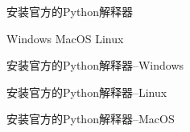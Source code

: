 \begin{frame}[standout]{安装官方的Python解释器}
    \begin{myoutline}
        \1 Windows
        \1 MacOS
        \1 Linux
    \end{myoutline}
\end{frame}

\begin{frame}[standout]安装官方的Python解释器--Windows\end{frame}
\begin{frame}[standout]安装官方的Python解释器--Linux\end{frame}
\begin{frame}[standout]安装官方的Python解释器--MacOS\end{frame}



